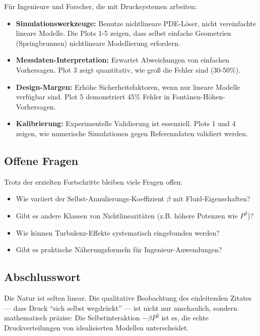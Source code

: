 \documentclass[a4paper,12pt]{article}
\theoremstyle{definition}
\begin{document}
Für Ingenieure und Forscher, die mit Drucksystemen arbeiten:

\begin{itemize}
	\item \textbf{Simulationswerkzeuge:} Benutze nichtlineare PDE-Löser, nicht vereinfachte lineare Modelle. Die Plots 1-5 zeigen, dass selbst einfache Geometrien (Springbrunnen) nichtlineare Modellierung erfordern.
	\item \textbf{Messdaten-Interpretation:} Erwartet Abweichungen von einfachen Vorhersagen. Plot 3 zeigt quantitativ, wie groß die Fehler sind (30-50\%).
	\item \textbf{Design-Margen:} Erhöhe Sicherheitsfaktoren, wenn nur lineare Modelle verfügbar sind. Plot 5 demonstriert 45\% Fehler in Fontänen-Höhen-Vorhersagen.
	\item \textbf{Kalibrierung:} Experimentelle Validierung ist essenziell. Plots 1 und 4 zeigen, wie numerische Simulationen gegen Referenzdaten validiert werden.
\end{itemize}

\subsection{Offene Fragen}

Trotz der erzielten Fortschritte bleiben viele Fragen offen:

\begin{itemize}
	\item Wie variiert der Selbst-Annulierungs-Koeffizient $\beta$ mit Fluid-Eigenschaften?
	\item Gibt es andere Klassen von Nichtlinearitäten (z.B. höhere Potenzen wie $P^3$)?
	\item Wie können Turbulenz-Effekte systematisch eingebunden werden?
	\item Gibt es praktische Näherungsformeln für Ingenieur-Anwendungen?
\end{itemize}

\subsection{Abschlusswort}

Die Natur ist selten linear. Die qualitative Beobachtung des einleitenden Zitates --- dass Druck ``sich selbst wegdrückt'' --- ist nicht nur anschaulich, sondern mathematisch präzise: Die Selbstinteraktion $-\beta P^2$ ist es, die echte Druckverteilungen von idealisierten Modellen unterscheidet.
\end{document}
